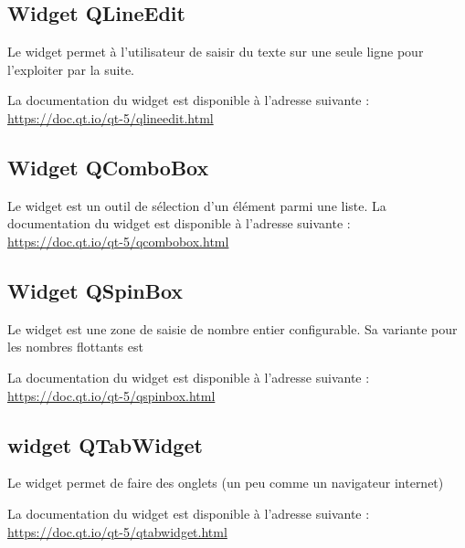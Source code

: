 \documentclass[12pt]{report}    %
\begin{document}
\subsection{Widget QLineEdit}

Le widget  permet à l'utilisateur de saisir du texte sur une seule ligne pour l'exploiter par la suite. 


La documentation du widget est disponible à l'adresse suivante : \newline  \url{https://doc.qt.io/qt-5/qlineedit.html}


\subsection{Widget QComboBox}

Le widget  est un outil de sélection d'un élément parmi une liste. \newline \newline
La documentation du widget est disponible à l'adresse suivante : \\  \url{https://doc.qt.io/qt-5/qcombobox.html} 



\subsection{Widget QSpinBox}

Le widget  est une zone de saisie de nombre entier configurable.
Sa variante pour les nombres flottants est  

La documentation du widget est disponible à l'adresse suivante : \newline  \url{https://doc.qt.io/qt-5/qspinbox.html} 


\subsection{widget QTabWidget}

Le widget  permet de faire des onglets (un peu comme un navigateur internet)


La documentation du widget est disponible à l'adresse suivante : \newline  \url{https://doc.qt.io/qt-5/qtabwidget.html} 
\end{document}
